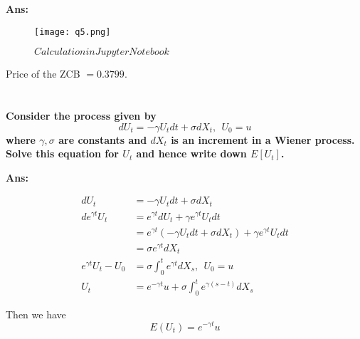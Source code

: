 \documentclass[11pt, notitlepage]{article}
\def\\ln{\mathrm{\ln}}
\def\\exp{\mathrm{\exp}}
\def\\max{\mathrm{\max}}
\begin{document}
\vspace{5mm}
\color{black}
\textbf {Ans:}

\begin{figure}[h]
\centering
  \texttt{[image: q5.png]}
  \caption{$Calculation in Jupyter Notebook$}
  \label{1b}
\end{figure}
Price of the ZCB $= 0.3799$.

\newpage
\color{red}
\section{}
\bfseries
Consider the process given by 
$$ dU_t = -\gamma U_t dt + \sigma dX_t, ~~U_0 =u$$
where $\gamma, \sigma$ are constants and $dX_t$ is an increment in a Wiener process. Solve this equation for $U_t$ and hence write down $E[U_t]$.
\mdseries

\vspace{5mm}
\color{black}
\textbf {Ans:}

\begin{equation*}
\begin{aligned}
dU_t &= -\gamma U_t dt + \sigma dX_t \\ 
d e^{\gamma t}U_t & = e^{\gamma t}dU_t + \gamma e^{\gamma t} U_t dt\\
& = e^{\gamma t}(-\gamma U_t dt + \sigma dX_t) + \gamma e^{\gamma t} U_t dt\\
&= \sigma e^{\gamma t} dX_t\\
e^{\gamma t} U_t - U_0 &= \sigma \int^t_0 e^{\gamma t} dX_s, ~~ U_0 = u\\
U_t & = e^{-\gamma t} u + \sigma \int^t_0 e^{\gamma (s-t)} dX_s
\end{aligned}
\end{equation*}

Then we have
$$ E(U_t) = e^{-\gamma t}u$$
\end{document}
